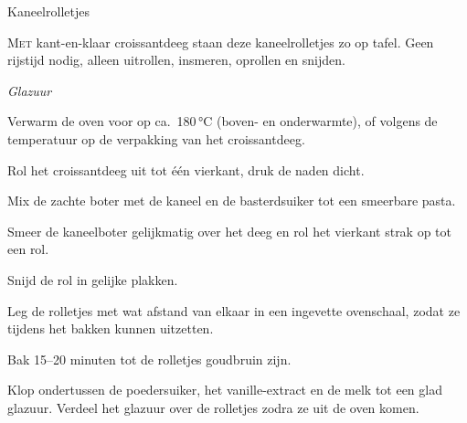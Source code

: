 \begin{recipe}{Kaneelrolletjes}


\lettrine{M}{et} kant-en-klaar croissantdeeg staan deze kaneelrolletjes zo op
tafel. Geen rijstijd nodig, alleen uitrollen, insmeren, oprollen en snijden.

\begin{ingredients}
\end{ingredients}

\medskip
\noindent\textit{Glazuur}
\begin{ingredients}
\end{ingredients}

\begin{steps}
  \item Verwarm de oven voor op ca.\ 180\,°C (boven- en onderwarmte), of
        volgens de temperatuur op de verpakking van het croissantdeeg.
  \item Rol het croissantdeeg uit tot één vierkant, druk de naden dicht.
  \item Mix de zachte boter met de kaneel en de basterdsuiker tot een
        smeerbare pasta.
  \item Smeer de kaneelboter gelijkmatig over het deeg en rol het vierkant
        strak op tot een rol.
  \item Snijd de rol in gelijke plakken.
  \item Leg de rolletjes met wat afstand van elkaar in een ingevette
        ovenschaal, zodat ze tijdens het bakken kunnen uitzetten.
  \item Bak 15--20 minuten tot de rolletjes goudbruin zijn.
  \item Klop ondertussen de poedersuiker, het vanille-extract en de melk tot
        een glad glazuur. Verdeel het glazuur over de rolletjes zodra ze uit
        de oven komen.
\end{steps}
\end{recipe}
